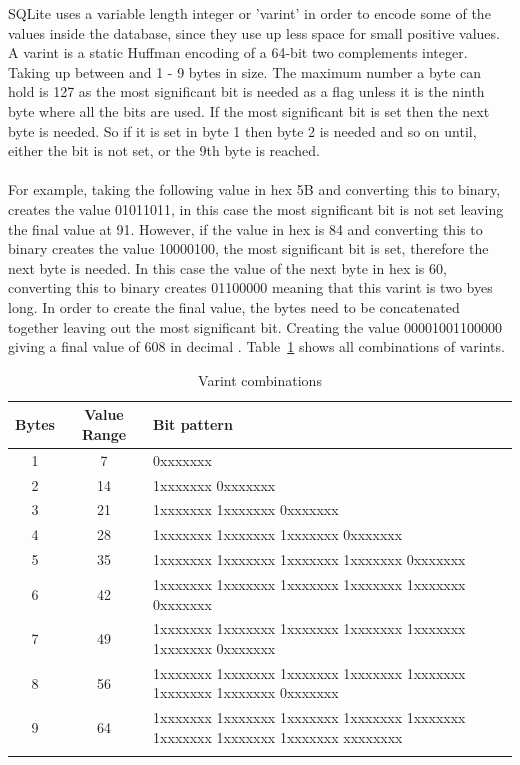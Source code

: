 SQLite uses a variable length integer or 'varint' in order to encode some of the values inside the database, since they use up less space for small positive values. A varint is a static Huffman encoding of a 64-bit two complements integer. Taking up between and 1 - 9 bytes in size. The maximum number a byte can hold is 127 as the most significant bit is needed as a flag unless it is the ninth byte where all the bits are used. If the most significant bit is set then the next byte is needed. So if it is set in byte 1 then byte 2 is needed and so on until, either the bit is not set, or the 9th byte is reached.
\\\\
For example, taking the following value in hex 5B and converting this to binary, creates the value 01011011, in this case the most significant bit is not set leaving the final value at 91. However, if the value in hex is 84 and converting this to binary creates the value 10000100, the most significant bit is set, therefore the next byte is needed. In this case the value of the next byte in hex is 60, converting this to binary creates  01100000 meaning that this varint is two byes long. In order to create the final value, the bytes need to be concatenated together leaving out the most significant bit. Creating the value 00001001100000 giving a final value of 608 in decimal \citep{sausagefactory}. Table~\ref{tbl:varints} shows  all combinations of varints. 

\begin{longtable}[h]{| c | c | p{10cm} |}
		\hline
			\textbf{Bytes} & \textbf{Value Range} & \textbf{Bit pattern} \\ 
		\hline
		\endhead
			1 & 7 &  0xxxxxxx \\ \hline
			2 & 14 & 1xxxxxxx 0xxxxxxx\\ \hline
			3 & 21 & 1xxxxxxx 1xxxxxxx 0xxxxxxx\\ \hline
			4 & 28 & 1xxxxxxx 1xxxxxxx 1xxxxxxx 0xxxxxxx\\ \hline
			5 & 35 & 1xxxxxxx 1xxxxxxx 1xxxxxxx 1xxxxxxx 0xxxxxxx\\ \hline
			6 & 42 & 1xxxxxxx 1xxxxxxx 1xxxxxxx 1xxxxxxx 1xxxxxxx 0xxxxxxx\\ \hline
			7 & 49 & 1xxxxxxx 1xxxxxxx 1xxxxxxx 1xxxxxxx 1xxxxxxx 1xxxxxxx 0xxxxxxx\\ \hline
			8 & 56 & 1xxxxxxx 1xxxxxxx 1xxxxxxx 1xxxxxxx 1xxxxxxx 1xxxxxxx 1xxxxxxx 0xxxxxxx\\ \hline
			9 & 64 & 1xxxxxxx 1xxxxxxx 1xxxxxxx 1xxxxxxx 1xxxxxxx 1xxxxxxx 1xxxxxxx 1xxxxxxx xxxxxxxx\\
		\hline
	\caption{Varint combinations \cite{sqliteray}}
	\label{tbl:varints}
\end{longtable}
\newpage
